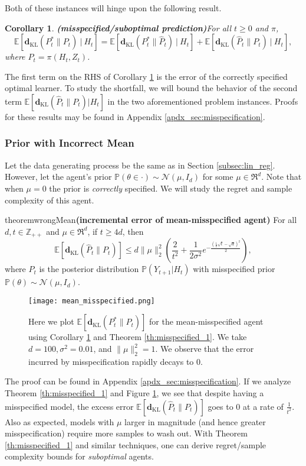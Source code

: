 \documentclass[twoside,11pt]{article}
\newtheorem{corollary}[theorem]{Corollary}
\def\KL{\mathbf{d}_{\mathrm{KL}}}
\def\normal{\mathcal{N}}
\def\E{\mathbb{E}}
\def\Pr{\mathbb{P}}
\begin{document}
Both of these instances will hinge upon the following result.
\begin{corollary} {\bf (misspecified/suboptimal prediction)}\label{cor:misspecification}
    For all $t\geq 0$ and $\pi$,
    $$\E[\KL(P_t^*\|P_t)\ |\ H_t] = \E[\KL(P^*_t\|\hat{P}_t)\ |\ H_t] + \E[\KL(\hat{P}_t\|P_t)\ |\ H_t],$$
    where $P_t = \pi(H_t, Z_t)$.
\end{corollary}
The first term on the RHS of Corollary \ref{cor:misspecification} is the error of the correctly specified optimal learner. To study the shortfall, we will bound the behavior of the second term $\E[\KL(\hat{P}_t\|P_t)|H_t]$ in the two aforementioned problem instances. Proofs for these results may be found in Appendix \ref{apdx_sec:misspecification}.

\subsubsection{Prior with Incorrect Mean}
Let the data generating process be the same as in Section \ref{subsec:lin_reg}. However, let the agent's prior $\Pr(\theta\in\cdot) \sim \mathcal{N}(\mu, I_d)$ for some $\mu\in\Re^d$. Note that when $\mu = 0$ the prior is \emph{correctly} specified. We will study the regret and sample complexity of this agent.

\begin{restatable}{theorem}{wrongMean}{\bf (incremental error of mean-misspecified agent)}
    \label{th:misspecified_1}
    For all $d, t \in \mathbb{Z}_{++}$ and $\mu \in \Re^d$, if $t \geq 4d$, then
    $$\E[\KL(\hat{P}_t \| P_t)] \leq d\|\mu\|_2^2\left(\frac{2}{t^2} + \frac{1}{2\sigma^2}e^{-\frac{\left(\frac{1}{2}\sqrt{t}-\sqrt{d}\right)^2}{2}}\right),$$
    where $P_t$ is the posterior distribution $\Pr(Y_{t+1}|H_t)$ with misspecified prior $\Pr(\theta)\sim\normal(\mu, I_d)$.
\end{restatable}
\begin{figure}
    \centering
    \texttt{[image: mean\_misspecified.png]}
    \caption{Here we plot $\E[\KL(P^*_t\|P_t)]$ for the mean-misspecified agent using Corollary \ref{cor:misspecification} and Theorem \ref{th:misspecified_1}. We take $d = 100, \sigma^2 = 0.01$, and $\|\mu\|^2_2 = 1$. We observe that the error incurred by misspecification rapidly decays to 0.}
    \label{fig:mean_misspecified}
\end{figure}
The proof can be found in Appendix \ref{apdx_sec:misspecification}. If we analyze Theorem \ref{th:misspecified_1} and Figure \ref{fig:mean_misspecified}, we see that despite having a misspecified model, the excess error $\E[\KL(\hat{P}_t \| P_t)]$ goes to $0$ at a rate of $\frac{1}{t^2}$. Also as expected, models with $\mu$ larger in magnitude (and hence greater misspecification) require more samples to wash out. With Theorem \ref{th:misspecified_1} and similar techniques, one can derive regret/sample complexity bounds for \emph{suboptimal} agents.
\end{document}
